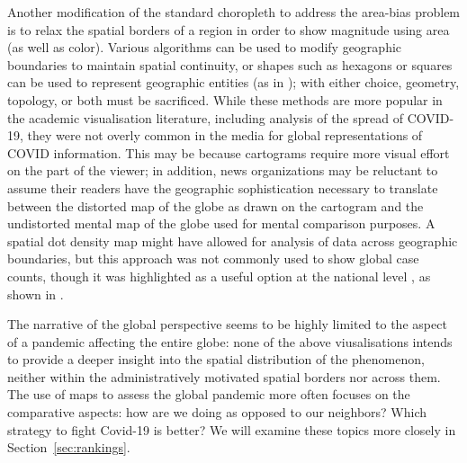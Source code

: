 \documentclass[article]{jdssv}\usepackage[]{graphicx}\usepackage[]{xcolor}
\begin{document}
Another modification of the standard choropleth to address the area-bias problem is to relax the spatial borders of a region in order to show magnitude using area (as well as color). Various algorithms can be used to modify geographic boundaries to maintain spatial continuity, or shapes such as hexagons or squares can be used to represent geographic entities (as in ); with either choice, geometry, topology, or both must be sacrificed.  While these methods are more popular in the academic visualisation literature, including analysis of the spread of COVID-19\citep{yalcinMappingGlobalSpatiotemporal2022}, they were not overly common in the media for global representations of COVID information. This may be because cartograms require more visual effort on the part of the viewer; in addition, news organizations may be reluctant to assume their readers have the geographic sophistication necessary to translate between the distorted map of the globe as drawn on the cartogram and the undistorted mental map of the globe used for mental comparison purposes. 
A spatial dot density map might have allowed for analysis of data across geographic boundaries, but this approach was not commonly used to show global case counts, though it was highlighted as a useful option at the national level \citep{fieldMappingCoronavirusResponsibly}, as shown in .

The narrative of the global perspective seems to be highly limited to the aspect of a pandemic affecting the entire globe: none of the above viusalisations intends to provide a deeper insight into the spatial distribution of the phenomenon, neither within the administratively motivated spatial borders nor across them. 
The use of maps to assess the global pandemic more often focuses on the comparative aspects: how are we doing as opposed to our neighbors? Which strategy to fight Covid-19 is better? 
We will examine these topics more closely in Section~\ref{sec:rankings}.
\end{document}
